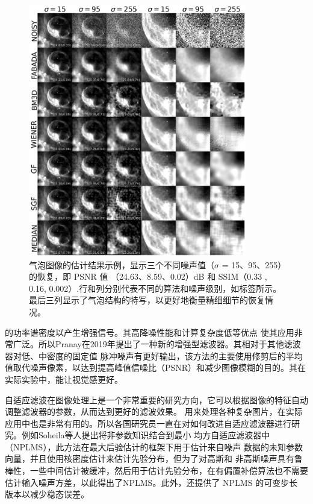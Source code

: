\begin{figure}[htbp]
	\begin{center}
		\includegraphics[width = 0.85\textwidth]{images/02.eps}
		\caption{气泡图像的估计结果示例，显示三个不同噪声值（$\sigma$ = 15、95、255）的恢复，即 PSNR 值
        （24.63、8.59、0.02）dB 和 SSIM（0.33 , 0.16, 0.002）.行和列分别代表不同的算法和噪声级别，如标签所示。最后三列显示了气泡结构的特写，以更好地衡量精细细节的恢复情况。} 
		\label{02} %
	\end{center}
\end{figure}

\noindent 的功率谱密度以产生增强信号。其高降噪性能和计算复杂度低等优点
使其应用非常广泛。所以Pranay在2019年提出了一种新的增强型滤波器\cite{kumarImageDeNoisingSalt2019}。其相对于其他滤波器对低、中密度的固定值
脉冲噪声有更好输出，该方法的主要使用修剪后的平均值取代噪声像素，以达到提高峰值信噪比（PSNR）和减少图像模糊的目的。其在实际实验中，能让视觉感更好。

自适应滤波在图像处理上是一个非常重要的研究方向，它可以根据图像的特征自动调整滤波器的参数，从而达到更好的滤波效果。
用来处理各种复杂图片，在实际应用中也是非常有用的。所以各国研究员一直在对如何改进自适应滤波器进行研究。例如Soheila等人提出将非参数知识结合到最小
均方自适应滤波器中（NPLMS）\cite{ashkezari-toussiIncorporatingNonparametricKnowledge2019}，此方法在最大后验估计的框架下用于估计来自噪声
数据的未知参数向量，并且使用核密度估计来估计先验分布，但为了对高斯和
非高斯噪声具有鲁棒性，一些中间估计被缓冲，然后用于估计先验分布，在有偏置补偿算法也不需要估计输入噪声方差，以此得出了NPLMS。此外，还提供了 NPLMS 的可变步长
版本以减少稳态误差。


